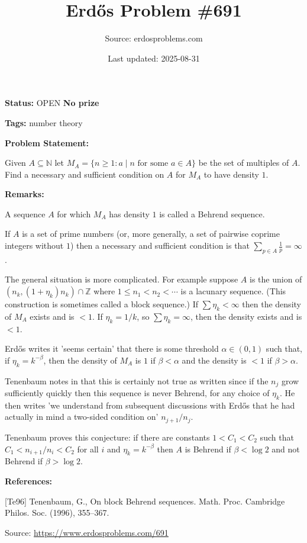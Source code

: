 \documentclass{article}
\title{Erd\H{o}s Problem \#691}
\date{Last updated: 2025-08-31}
\author{Source: erdosproblems.com}
\begin{document}
\maketitle

\noindent\textbf{Status:} OPEN \quad \textbf{No prize}

\noindent\textbf{Tags:} number theory

\medskip
\noindent\textbf{Problem Statement:}

Given $A\subseteq \mathbb{N}$ let $M_A=\{ n \geq 1 : a\mid n\textrm{ for some }a\in A\}$ be the set of multiples of $A$. Find a necessary and sufficient condition on $A$ for $M_A$ to have density $1$.

\bigskip
\noindent\textbf{Remarks:}

A sequence $A$ for which $M_A$ has density $1$ is called a Behrend sequence.

If $A$ is a set of prime numbers (or, more generally, a set of pairwise coprime integers without $1$) then a necessary and sufficient condition is that $\sum_{p\in A}\frac{1}{p}=\infty$.

The general situation is more complicated. For example suppose $A$ is the union of $(n_k,(1+\eta_k)n_k)\cap \mathbb{Z}$ where $1\leq n_1<n_2<\cdots$ is a lacunary sequence. (This construction is sometimes called a block sequence.) If $\sum \eta_k<\infty$ then the density of $M_A$ exists and is $<1$. If $\eta_k=1/k$, so $\sum \eta_k=\infty$, then the density exists and is $<1$.

Erd\H{o}s writes it 'seems certain' that there is some threshold $\alpha\in (0,1)$ such that, if $\eta_k=k^{-\beta}$, then the density of $M_A$ is $1$ if $\beta <\alpha$ and the density is $<1$ if $\beta >\alpha$.

Tenenbaum notes in \cite{Te96} that this is certainly not true as written since if the $n_j$ grow sufficiently quickly then this sequence is never Behrend, for any choice of $\eta_k$. He then writes 'we understand from subsequent discussions with Erd\H{o}s that he had actually in mind a two-sided condition on' $n_{j+1}/n_j$.

Tenenbaum \cite{Te96} proves this conjecture: if there are constants $1<C_1<C_2$ such that $C_1<n_{i+1}/n_i<C_2$ for all $i$ and $\eta_k=k^{-\beta}$ then $A$ is Behrend if $\beta<\log 2$ and not Behrend if $\beta>\log 2$.

\bigskip
\noindent\textbf{References:}

[Te96] Tenenbaum, G., On block {B}ehrend sequences. Math. Proc. Cambridge Philos. Soc. (1996), 355--367.

\bigskip
\noindent\small{Source: \url{https://www.erdosproblems.com/691}}
\end{document}
